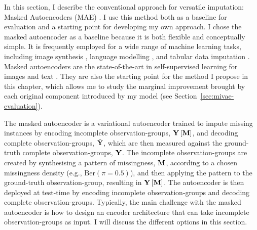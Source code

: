 \documentclass[../thesis.tex]{subfiles}
\begin{document}
In this section, I describe the conventional approach for versatile imputation: Masked Autoencoders (MAE) \citep{vincentExtractingComposingRobust2008,bengioGeneralizedDenoisingAutoencoders2013,heMaskedAutoencodersAre2022}. I use this method both as a baseline for evaluation and a starting point for developing my own approach. I chose the masked autoencoder as a baseline because it is both flexible and conceptually simple. It is frequently employed for a wide range of machine learning tasks, including image synthesis \citep{heMaskedAutoencodersAre2022}, language modelling \citep{devlinBERTPretrainingDeep2019}, and tabular data imputation \citep{gondaraMIDAMultipleImputation2018}. Masked autoencoders are the state-of-the-art in self-supervised learning for images and text \citep{tangSelfsupervisedLearningDataefficient2024}. They are also the starting point for the method I propose in this chapter, which allows me to study the marginal improvement brought by each original component introduced by my model (see Section~\ref{sec:mivae-evaluation}).

The masked autoencoder is a variational autoencoder \citep{kingma2013auto,rezende2014stochastic} trained to impute missing instances by encoding incomplete observation-groups, $\mygroup{\myrv{y}} \left[ \mygroup{\myrv{m}} \right]$, and decoding complete observation-groups, $\tilde{\mygroup{\myrv{y}}}$, which are then measured against the ground-truth complete observation-groups, $\mygroup{\myrv{y}}$. The incomplete observation-groups are created by synthesising a pattern of missingness, $\mygroup{\myrv{m}}$, according to a chosen missingness density (e.g., $\mathrm{Ber} \left( \pi = 0.5 \right)$), and then applying the pattern to the ground-truth observation-group, resulting in $\mygroup{\myrv{y} \left[\myrv{m}\right]}$. The autoencoder is then deployed at test-time by encoding incomplete observation-groups and decoding complete observation-groups. Typically, the main challenge with the masked autoencoder is how to design an encoder architecture that can take incomplete observation-groups as input. I will discuss the different options in this section.
\end{document}
